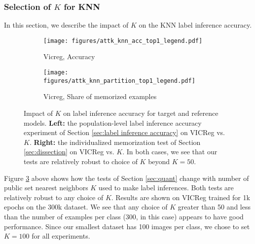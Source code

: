 
\subsubsection{Selection of $K$ for KNN}
\label{sec:appx KNN} 
In this section, we describe the impact of $K$ on the KNN label inference accuracy. 

\begin{figure}[ht]
     \centering
     \begin{subfigure}[b]{0.49\textwidth}
         \centering
         \texttt{[image: figures/attk\_knn\_acc\_top1\_legend.pdf]}
         \caption{Vicreg, Accuracy}
         \label{fig:vicreg v. epoch}
     \end{subfigure}
     \hfill
     \begin{subfigure}[b]{0.49\textwidth}
         \centering
         \texttt{[image: figures/attk\_knn\_partition\_top1\_legend.pdf]}
         \caption{Vicreg, Share of memorized examples }
         \label{fig:vicreg lp v. epoch}
     \end{subfigure}
     \hfill
\caption[Impact of $K$ on label inference accuracy for target and reference models.]{
Impact of $K$ on label inference accuracy for target and reference models. \textbf{Left:} the population-level label inference accuracy experiment of Section \ref{sec:label inference accuracy} on VICReg vs. $K$. \textbf{Right:} the individualized memorization test of Section \ref{sec:dissection} on VICReg vs. $K$. In both cases, we see that our tests are relatively robust to choice of $K$ beyond $K=50$.  
}
\label{fig:attack v K}
\end{figure}

Figure \ref{fig:attack v K} above shows how the tests of Section \ref{sec:quant} change with number of public set nearest neighbors $K$ used to make label inferences. Both tests are relatively robust to any choice of $K$. Results are shown on VICReg trained for 1k epochs on the 300k dataset. We see that any choice of $K$ greater than 50 and less than the number of examples per class (300, in this case) appears to have good performance. Since our smallest dataset has 100 images per class, we chose to set $K = 100$ for all experiments. 

\clearpage

